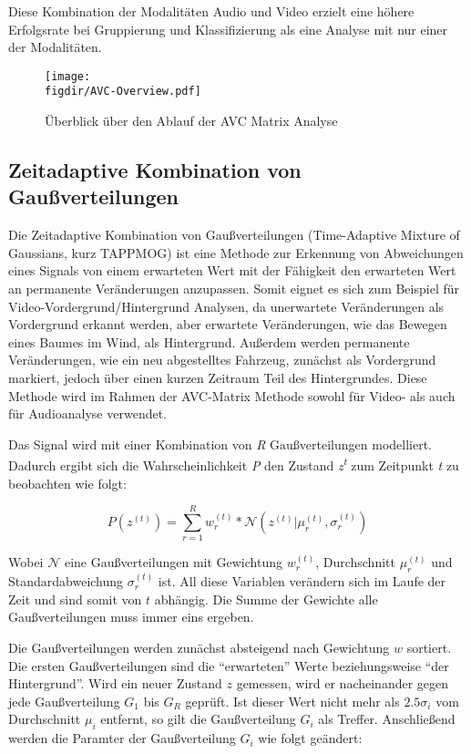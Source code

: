 Diese Kombination der Modalitäten Audio und Video erzielt eine höhere Erfolgsrate bei Gruppierung und Klassifizierung als eine Analyse mit nur einer der Modalitäten. 

\begin{figure}
\centering
\texttt{[image: \\figdir/AVC-Overview.pdf]}
\caption{Überblick über den Ablauf der AVC Matrix Analyse}
\label{FIG:AVC:Overview}
\end{figure}

\subsection{Zeitadaptive Kombination von Gaußverteilungen}\label{ss:TAPPMOG}

Die Zeitadaptive Kombination von Gaußverteilungen (Time-Adaptive Mixture of Gaussians, kurz TAPPMOG) ist eine Methode zur Erkennung von Abweichungen eines Signals von einem erwarteten Wert mit der Fähigkeit den erwarteten Wert an permanente Veränderungen anzupassen. Somit eignet es sich zum Beispiel für Video-Vordergrund/Hintergrund Analysen, da unerwartete Veränderungen als Vordergrund erkannt werden, aber erwartete Veränderungen, wie das Bewegen eines Baumes im Wind, als Hintergrund. Außerdem werden permanente Veränderungen, wie ein neu abgestelltes Fahrzeug, zunächst als Vordergrund markiert, jedoch über einen kurzen Zeitraum Teil des Hintergrundes. Diese Methode wird im Rahmen der AVC-Matrix Methode sowohl für Video- als auch für Audioanalyse verwendet.  

Das Signal wird mit einer Kombination von \textit{R} Gaußverteilungen modelliert. Dadurch ergibt sich die Wahrscheinlichkeit \textit{P} den Zustand \textit{z\textsuperscript{t}} zum Zeitpunkt \textit{t} zu beobachten wie folgt:

\begin{equation}
P(z^{(t)}) = \sum\limits_{r=1}^R w_r^{(t)} * \mathcal{N}(z^{(t)} | \mu _r^{(t)}, \sigma _r^{(t)})
\end{equation}

Wobei $\mathcal{N}$ eine Gaußverteilungen mit Gewichtung $w_r^{(t)}$, Durchschnitt $\mu _r^{(t)}$ und Standardabweichung $\sigma _r^{(t)}$ ist. All diese Variablen verändern sich im Laufe der Zeit und sind somit von $t$ abhängig. Die Summe der Gewichte alle Gaußverteilungen muss immer eins ergeben.  

Die Gaußverteilungen werden zunächst absteigend nach Gewichtung $w$ sortiert. Die ersten Gaußverteilungen sind die ``erwarteten'' Werte beziehungsweise ``der Hintergrund''. Wird ein neuer Zustand $z$ gemessen, wird er nacheinander gegen jede Gaußverteilung $G_1$ bis $G_R$ geprüft. Ist dieser Wert nicht mehr als $2.5\sigma_i$ vom Durchschnitt $\mu_i$ entfernt, so gilt die Gaußverteilung $G_i$ als Treffer. Anschließend werden die Paramter der Gaußverteilung $G_i$ wie folgt geändert:

